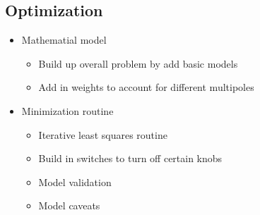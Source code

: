 \subsection{Optimization}

\begin{itemize}
  \item Mathematial model
    \begin{itemize}
      \item Build up overall problem by add basic models
      \item Add in weights to account for different multipoles 
    \end{itemize}
  \item Minimization routine
    \begin{itemize}
      \item Iterative least squares routine
      \item Build in switches to turn off certain knobs 
      \item Model validation
      \item Model caveats
    \end{itemize}
\end{itemize}

